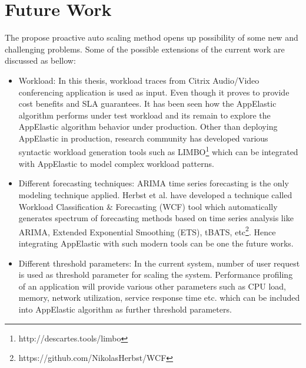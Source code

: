 \section{Future Work}
\label{sec:Future Work}
The propose proactive auto scaling method opens up possibility of some new and challenging problems. Some of the possible extensions of the current work are discussed as bellow:
\begin{itemize}
  \item Workload: In this thesis, workload traces from Citrix Audio/Video conferencing application is used as input. Even though it proves to provide cost benefits and SLA guarantees. It has been seen how the AppElastic algorithm performs under test workload and its remain to explore the AppElastic algorithm behavior under production. Other than deploying AppElastic in production, research community has developed various syntactic workload generation tools such as LIMBO\cite{von2014limbo}\footnote{http://descartes.tools/limbo} which can be integrated with AppElastic to model complex workload patterns.
  \item Different forecasting techniques: ARIMA time series forecasting is the only modeling technique applied. Herbst et al.\cite{herbst2012workload} have developed a technique called Workload Classification \& Forecasting (WCF) tool which automatically generates spectrum of forecasting methods based on time series analysis like ARIMA, Extended Exponential Smoothing (ETS), tBATS, etc\cite{herbst2012workload}\footnote{https://github.com/NikolasHerbst/WCF}. Hence integrating AppElastic with such modern tools can be one the future works.
  \item Different threshold parameters: In the current system, number of user request is used as threshold parameter for scaling the system. Performance profiling of an application will provide various other parameters such as CPU load, memory, network utilization, service response time etc. which can be included into AppElastic algorithm as further threshold parameters.
\end{itemize}
